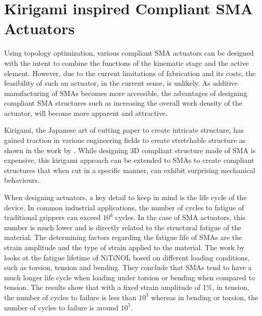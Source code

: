 
\section{Kirigami inspired Compliant SMA Actuators}\label{sec:kirigami}
Using topology optimization, various compliant SMA actuators can be designed with the intent to combine the functions of the kinematic stage and the active element. However, due to the current limitations of fabrication and its costs, the feasibility of such an actuator, in the current sense, is unlikely. As additive manufacturing of SMAs becomes more accessible, the advantages of designing compliant SMA structures such as increasing the overall work density of the actuator, will become more apparent and attractive.

Kirigami, the Japanese art of cutting paper to create intricate structure, has gained traction in various engineering fields to create stretchable structure as shown in the work by \cite{tangProgrammableKiriKirigamiMetamaterials2017}. While designing 3D compliant structure made of SMA is expensive, this kirigami approach can be extended to SMAs to create compliant structures that when cut in a specific manner, can exhibit surprising mechanical behaviours.

When designing actuators, a key detail to keep in mind is the life cycle of the device. In common industrial applications, the number of cycles to fatigue of traditional grippers can exceed $10^6$ cycles. In the case of SMA actuators, this number is much lower and is directly related to the structural fatigue of the material. The determining factors regarding the fatigue life of SMAs are the strain amplitude and the type of strain applied to the material. The work by \cite{runcimanEquivalentStrainCoffin2011} looks at the fatigue lifetime of NiTiNOL based on different loading conditions, such as torsion, tension and bending. They conclude that SMAs tend to have a much longer life cycle when loading under torsion or bending when compared to tension. The results show that with a fixed strain amplitude of 1\%, in tension, the number of cycles to failure is less than $10^3$ whereas in bending or torsion, the number of cycles to failure is around $10^5$.

